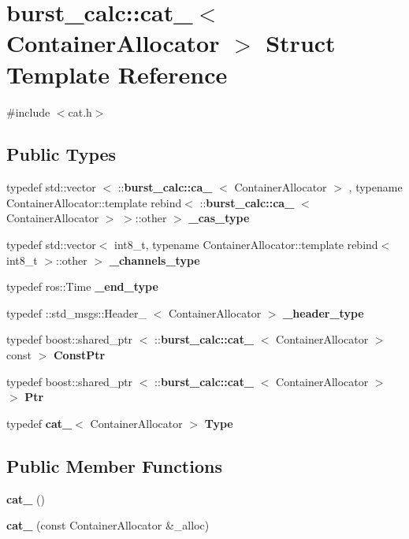 \section{burst\-\_\-calc\-:\-:cat\-\_\-$<$ \-Container\-Allocator $>$ \-Struct \-Template \-Reference}
\label{structburst__calc_1_1cat__}


{\ttfamily \#include $<$cat.\-h$>$}

\subsection*{\-Public \-Types}
\begin{DoxyCompactItemize}
\item 
typedef std\-::vector\*
$<$ \-::{\bf burst\-\_\-calc\-::ca\-\_\-}\*
$<$ \-Container\-Allocator $>$\*
, typename \*
\-Container\-Allocator\-::template \*
rebind$<$ \-::{\bf burst\-\_\-calc\-::ca\-\_\-}\*
$<$ \-Container\-Allocator $>$\*
 $>$\-::other $>$ {\bf \-\_\-cas\-\_\-type}
\item 
typedef std\-::vector$<$ int8\-\_\-t, \*
typename \*
\-Container\-Allocator\-::template \*
rebind$<$ int8\-\_\-t $>$\-::other $>$ {\bf \-\_\-channels\-\_\-type}
\item 
typedef ros\-::\-Time {\bf \-\_\-end\-\_\-type}
\item 
typedef \-::std\-\_\-msgs\-::\-Header\-\_\-\*
$<$ \-Container\-Allocator $>$ {\bf \-\_\-header\-\_\-type}
\item 
typedef boost\-::shared\-\_\-ptr\*
$<$ \-::{\bf burst\-\_\-calc\-::cat\-\_\-}\*
$<$ \-Container\-Allocator $>$ const  $>$ {\bf \-Const\-Ptr}
\item 
typedef boost\-::shared\-\_\-ptr\*
$<$ \-::{\bf burst\-\_\-calc\-::cat\-\_\-}\*
$<$ \-Container\-Allocator $>$ $>$ {\bf \-Ptr}
\item 
typedef {\bf cat\-\_\-}$<$ \-Container\-Allocator $>$ {\bf \-Type}
\end{DoxyCompactItemize}
\subsection*{\-Public \-Member \-Functions}
\begin{DoxyCompactItemize}
\item 
{\bf cat\-\_\-} ()
\item 
{\bf cat\-\_\-} (const \-Container\-Allocator \&\-\_\-alloc)
\end{DoxyCompactItemize}
